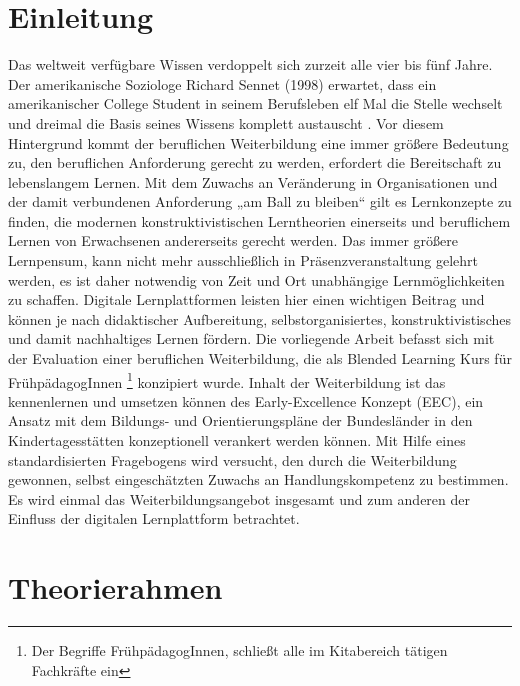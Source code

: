 \documentclass[12pt, bibliography=totoc]{scrartcl}
\begin{document}
%
\tableofcontents
\listoftables
\listoffigures
\clearpage
\pagebreak
{}
\section{Einleitung}\label{einleitung}

 \glqq Das weltweit verfügbare
Wissen verdoppelt sich zurzeit alle vier bis fünf Jahre. Der
amerikanische Soziologe Richard Sennet (1998) erwartet, dass ein
amerikanischer College Student in seinem Berufsleben elf Mal die Stelle
wechselt und dreimal die Basis seines Wissens komplett austauscht
\parencite[138]{Ehlers2002}.\grqq{} Vor diesem Hintergrund kommt der
beruflichen Weiterbildung eine immer größere Bedeutung zu, den
beruflichen Anforderung gerecht zu werden, erfordert die Bereitschaft zu
lebenslangem Lernen. Mit dem Zuwachs an Veränderung in Organisationen
und der damit verbundenen Anforderung „am Ball zu bleiben`` gilt es
Lernkonzepte zu finden, die modernen konstruktivistischen Lerntheorien
einerseits und beruflichem Lernen von Erwachsenen andererseits gerecht
werden. Das immer größere Lernpensum, kann nicht mehr ausschließlich in
Präsenzveranstaltung gelehrt werden, es ist daher notwendig von Zeit und
Ort unabhängige Lernmöglichkeiten zu schaffen. Digitale Lernplattformen
leisten hier einen wichtigen Beitrag und können je nach didaktischer
Aufbereitung, selbstorganisiertes, konstruktivistisches und damit
nachhaltiges Lernen fördern. Die vorliegende Arbeit befasst sich mit der
Evaluation einer beruflichen Weiterbildung, die als Blended Learning
Kurs für FrühpädagogInnen
\footnote{Der Begriffe FrühpädagogInnen, schließt alle im Kitabereich tätigen Fachkräfte ein}
konzipiert wurde. Inhalt der Weiterbildung ist das kennenlernen und
umsetzen können des Early-Excellence Konzept (EEC), ein Ansatz mit dem
Bildungs- und Orientierungspläne der Bundesländer in den
Kindertagesstätten konzeptionell verankert werden können. Mit Hilfe
eines standardisierten Fragebogens wird versucht, den durch die
Weiterbildung gewonnen, selbst eingeschätzten Zuwachs an
Handlungskompetenz zu bestimmen. Es wird einmal das
Weiterbildungsangebot insgesamt und zum anderen der Einfluss der
digitalen Lernplattform betrachtet.

\section{Theorierahmen}\label{theorierahmen}
\end{document}
